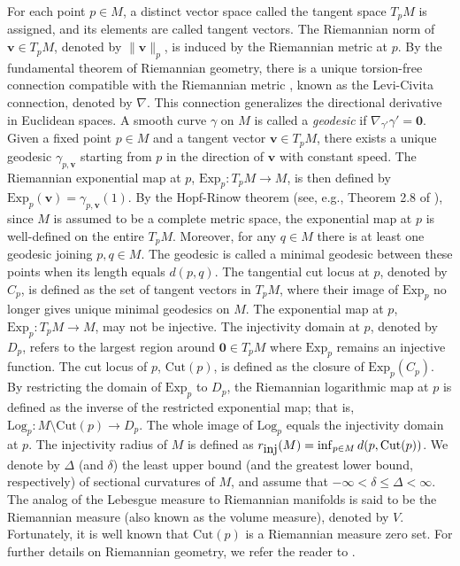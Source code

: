 \documentclass[preprint]{imsart}
\theoremstyle{plain}
\theoremstyle{remark}
\begin{document}
%
For each point $p \in M$, a distinct vector space called the tangent space $T_{p}M$ is assigned, and its elements are called tangent vectors. The Riemannian norm of $\mathbf{v} \in T_pM$, denoted by $\| \mathbf{v} \|_{p}$, is induced by the Riemannian metric at $p$. By the fundamental theorem of Riemannian geometry, there is a unique torsion-free connection compatible with the Riemannian metric \citep[Theorem 5.4,][]{lee2006riemannian}, known as the Levi-Civita connection, denoted  by $\nabla$. This connection generalizes the directional derivative in Euclidean spaces. A smooth curve $\gamma$ on $M$ is called a \emph{geodesic} if $\nabla_{\gamma'} \gamma'= \textbf{0}$. Given a fixed point $p \in M$ and a tangent vector $\mathbf{v} \in T_{p}M$, there exists a unique geodesic $\gamma_{p, \mathbf{v}}$ starting from $p$ in the direction of $\mathbf{v}$ with constant speed. The Riemannian exponential map at $p$, $\mbox{Exp}_{p}:T_{p}M \to M$, is then defined by $\mbox{Exp}_{p}(\mathbf{v})=\gamma_{p, \mathbf{v}}(1)$. 
%
By the Hopf-Rinow theorem (see, e.g., Theorem 2.8 of \cite{do1992riemannian}), 
since $M$ is assumed to be a complete metric space, the exponential map at $p$ is well-defined on the entire $T_{p}M$. Moreover, for any $q\in M$ there is at least one geodesic joining $p, q \in M$. The geodesic is called a minimal geodesic between these points when its length equals $d(p, q)$. The tangential cut locus at $p$, denoted by $C_p$, is defined as the set of tangent vectors in $T_{p}M$, where their image of $\mbox{Exp}_{p}$ no longer gives unique minimal geodesics on $M$. 
The exponential map at $p$, $\mbox{Exp}_{p}: T_{p}M \to M$, may not be injective. 
The injectivity domain at $p$, denoted by $D_p$, refers to the largest region around $\mathbf{0} \in T_{p}M$ where $\mbox{Exp}_{p}$ remains an injective function. The cut locus of $p$, $\mbox{Cut}(p)$, is defined as the closure of $\mbox{Exp}_{p}(C_p)$. 
%
By restricting the domain of $\mbox{Exp}_{p}$ to $D_p$, the Riemannian logarithmic map at $p$ is defined as the inverse of the restricted exponential map; that is, $\mbox{Log}_{p}: M\setminus \mbox{Cut}(p) \to D_p$. The whole image of $\mbox{Log}_{p}$ equals the injectivity domain at $p$. The injectivity radius of $M$ is defined as $r_{\mbox{\tiny inj}}(M) = \inf_{p \in M} d(p, \mbox{Cut}(p))$. 
We denote by $\Delta$ (and $\delta$) the least upper bound (and the greatest lower bound, respectively) of sectional curvatures of $M$, and assume that $ -\infty < \delta \le \Delta < \infty$.
The analog of the Lebesgue measure to Riemannian manifolds is said to be the Riemannian measure (also known as the volume measure), denoted by $V$. Fortunately, it is well known that $\mbox{Cut}(p)$ is a Riemannian measure zero set. 
For further details on Riemannian geometry, we refer the reader to \cite{do1992riemannian, chavel2006riemannian,petersen2006riemannian,lee2006riemannian}.
\end{document}
